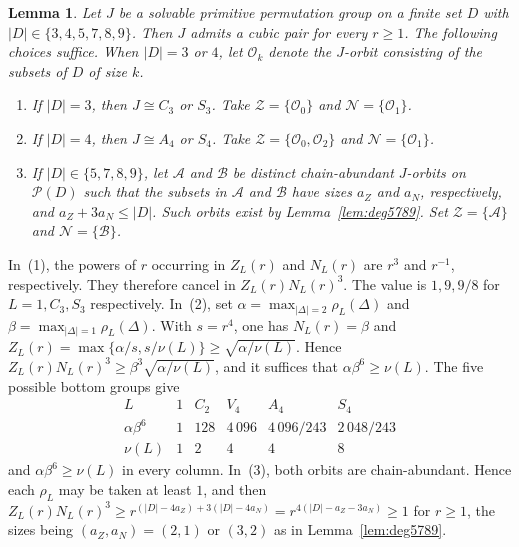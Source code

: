 \documentclass[10pt]{amsart}
\newtheorem{lemma}[theorem]{Lemma}
\theoremstyle{definition}
\renewcommand{\ge}{\geqslant}
\renewcommand{\leq}{\leqslant}
\let\oldendproof\endproof
\renewenvironment{proof}[1][\proofname]{%
  \oldproof[\bfseries #1]%
}{\oldendproof}
\newcommand{\pow}{\mathcal{P}}
\numberwithin{equation}{section}
\numberwithin{table}{section}
\begin{document}
\begin{lemma}\label{lem:weighted-small}
Let $J$ be a solvable primitive permutation group on a finite set $D$ with
$|D|\in\{3,4,5,7,8,9\}$. Then $J$ admits a cubic pair for every $r\ge1$.
The following choices suffice. When $|D|=3$ or $4$, let $\mathcal O_k$
denote the $J$-orbit consisting of the subsets of $D$ of size $k$.
\begin{enumerate}
\item If $|D|=3$, then $J\cong C_3$ or $S_3$. Take
$\mathcal Z=\{\mathcal O_0\}$ and $\mathcal N=\{\mathcal O_1\}$.
\item If $|D|=4$, then $J\cong A_4$ or $S_4$. Take
$\mathcal Z=\{\mathcal O_0,\mathcal O_2\}$ and
$\mathcal N=\{\mathcal O_1\}$.
\item If $|D|\in\{5,7,8,9\}$, let $\mathcal A$ and $\mathcal B$ be
distinct chain-abundant $J$-orbits on $\pow(D)$ such that the subsets in
$\mathcal A$ and $\mathcal B$ have sizes $a_Z$ and $a_N$, respectively, and
$a_Z+3a_N\leq|D|$. Such orbits exist by
Lemma~\textup{\ref{lem:deg5789}}. Set $\mathcal Z=\{\mathcal A\}$ and
$\mathcal N=\{\mathcal B\}$.
\end{enumerate}
\end{lemma}

\begin{proof}
In~(1), the powers of $r$ occurring in $Z_L(r)$ and $N_L(r)$ are $r^3$
and $r^{-1}$, respectively. They therefore cancel in
$Z_L(r)N_L(r)^3$. The value is $1,9,9/8$ for $L=1,C_3,S_3$
respectively. In~(2), set $\alpha=\max_{|\Delta|=2}\rho_L(\Delta)$ and
$\beta=\max_{|\Delta|=1}\rho_L(\Delta)$. With $s=r^4$, one has
$N_L(r)=\beta$ and $Z_L(r)=\max\{\alpha/s,s/\nu(L)\}\ge\sqrt{\alpha/\nu(L)}$. Hence $Z_L(r)N_L(r)^{3}\ge\beta^{3}\sqrt{\alpha/\nu(L)}$, and it suffices that $\alpha\beta^{6}\ge
\nu(L)$. The five possible bottom groups give
$$
\renewcommand{\arraystretch}{1.15}
\begin{array}{c|ccccc}
 L & 1 & C_2 & V_4 & A_4 & S_4\\\hline
 \alpha\beta^{6} & 1 & 128 & 4\,096 & 4\,096/243 & 2\,048/243\\
 \nu(L) & 1 & 2 & 4 & 4 & 8
\end{array}
$$
and $\alpha\beta^{6}\ge \nu(L)$ in every column. In~(3), both orbits are
chain-abundant. Hence each $\rho_L$ may be taken at least $1$, and then
$Z_L(r)N_L(r)^{3}\ge r^{(|D|-4a_Z)+3(|D|-4a_N)}=r^{4(|D|-a_Z-3a_N)}\ge1$ for $r\ge1$,
the sizes being $(a_Z,a_N)=(2,1)$ or $(3,2)$ as in
Lemma~\ref{lem:deg5789}.
\end{proof}
\end{document}
